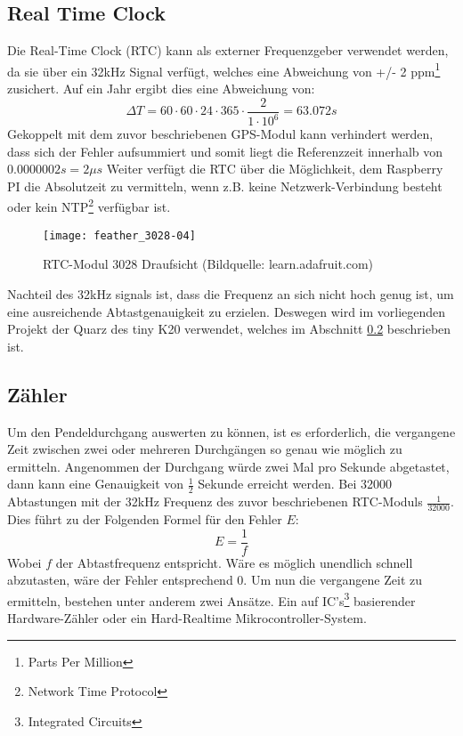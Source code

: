 \subsection{Real Time Clock}
\label{cap:RTC}
	Die Real-Time Clock (RTC) kann als externer Frequenzgeber verwendet werden, da sie über ein 32kHz Signal verfügt, welches eine Abweichung von +/- 2 ppm\footnote{Parts Per Million} zusichert. Auf ein Jahr ergibt dies eine Abweichung von:
	\[
		\Delta{T} = 60 \cdot 60 \cdot 24 \cdot 365 \cdot \frac{2}{1\cdot 10^6} = 63.072s
	\]
	Gekoppelt mit dem zuvor beschriebenen GPS-Modul kann verhindert werden, dass sich der Fehler aufsummiert und somit liegt die Referenzzeit innerhalb von $0.0000002s = 2\mu{s}$ 
	Weiter verfügt die RTC über die Möglichkeit, dem Raspberry PI die Absolutzeit zu vermitteln, wenn z.B. keine Netzwerk-Verbindung besteht oder kein NTP\footnote{Network Time Protocol} verfügbar ist.
		\begin{figure}[H]
        	\centering
        	\texttt{[image: feather\_3028-04]}
        	\caption{RTC-Modul 3028 Draufsicht (Bildquelle: learn.adafruit.com)}
        	\label{fig:RTC3028}
    	\end{figure}
Nachteil des 32kHz signals ist, dass die Frequenz an sich nicht hoch genug ist, um eine ausreichende Abtastgenauigkeit zu erzielen.
Deswegen wird im vorliegenden Projekt der Quarz des tiny K20 verwendet, welches im Abschnitt \ref{cap:counter} beschrieben ist.
%
%
\subsection{Zähler}
\label{cap:counter}
	Um den Pendeldurchgang auswerten zu können, ist es erforderlich, die vergangene Zeit zwischen zwei oder mehreren Durchgängen so genau wie möglich zu ermitteln. Angenommen der Durchgang würde zwei Mal pro Sekunde abgetastet, dann kann eine Genauigkeit von $\frac{1}{2}$ Sekunde erreicht werden. Bei 32000 Abtastungen mit der 32kHz Frequenz des zuvor beschriebenen RTC-Moduls $\frac{1}{32000}$. Dies führt zu der Folgenden Formel für den Fehler $E$:
	\[
		E = \frac{1}{f}
	\]
	Wobei $f$ der Abtastfrequenz entspricht. Wäre es möglich unendlich schnell abzutasten, wäre der Fehler entsprechend 0. Um nun die vergangene Zeit zu ermitteln, bestehen unter anderem zwei Ansätze. Ein auf IC's\footnote{Integrated Circuits} basierender Hardware-Zähler oder ein Hard-Realtime Mikrocontroller-System.
